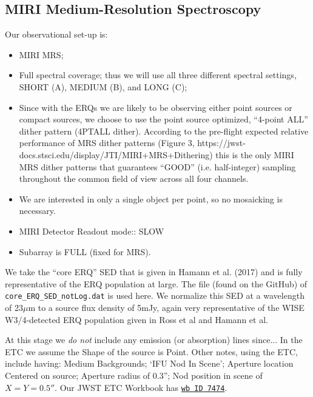     \subsection{MIRI Medium-Resolution Spectroscopy}
    Our observational set-up is:
         \begin{itemize}
           \item MIRI MRS; 
           \item Full spectral coverage; thus we will use all three different spectral settings, SHORT (A), MEDIUM (B), and LONG (C);  
           \item Since with the ERQs we are likely to be observing
             either point sources or compact sources, we choose to use the point
             source optimized, ``4-point ALL'' dither pattern (4PTALL
             dither). According to the pre-flight expected relative performance of
             MRS dither patterns (Figure 3,
             https://jwst-docs.stsci.edu/display/JTI/MIRI+MRS+Dithering) this is
             the only MIRI MRS dither patterns that guarantees ``GOOD''
             (i.e. half-integer) sampling throughout the common field of view
             across all four channels.
           \item We are interested in only a single object per point, so no mosaicking is necessary.  
           \item{MIRI Detector Readout mode:: SLOW}
             \item{Subarray is FULL (fixed for MRS).}
         \end{itemize}
         
\smallskip \smallskip 
\noindent
We take the ``core ERQ'' SED that is given in Hamann et al. (2017) and
is fully representative of the ERQ population at large.  The file
(found on the GitHub) of {\tt core\_ERQ\_SED\_notLog.dat} is used
here.  We normalize this SED at a wavelength of 23$\mu$m to a source
flux density of 5mJy, again very representative of the WISE
W3/4-detected ERQ population given in Ross et al and Hamann et al.

\smallskip \smallskip 
\noindent
At this stage we {\it do not} include any emission (or absorption)
lines since...  In the ETC we assume the Shape of the source is Point.
Other notes, using the ETC, include having: Medium Backgrounds; `IFU
Nod In Scene'; Aperture location Centered on source; Aperture radius
of 0.3''; Nod position in scene of $X=Y=0.5''$.  Our JWST ETC Workbook
has \href{https://jwst.etc.stsci.edu/workbook.html?wb_id=7474}{{\tt wb
ID 7474}}.



